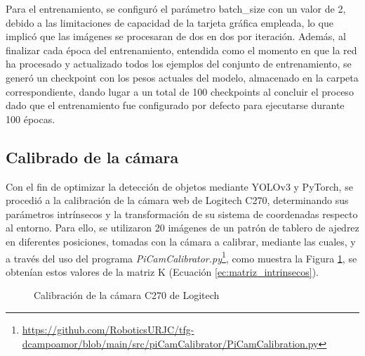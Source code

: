 Para el entrenamiento, se configuró el parámetro batch\_size con un valor de 2, debido a las limitaciones de capacidad de la tarjeta gráfica empleada, lo que implicó que las imágenes se procesaran de dos en dos por iteración. Además, al finalizar cada época del entrenamiento, entendida como el momento en que la red ha procesado y actualizado todos los ejemplos del conjunto de entrenamiento, se generó un checkpoint con los pesos actuales del modelo, almacenado en la carpeta correspondiente, dando lugar a un total de 100 checkpoints al concluir el proceso dado que el entrenamiento fue configurado por defecto para ejecutarse durante 100 épocas.

\subsection{Calibrado de la cámara}
\label{sec:Calibrado_camara}

Con el fin de optimizar la detección de objetos mediante YOLOv3 y PyTorch, se procedió a la calibración de la cámara web de Logitech C270, determinando sus parámetros intrínsecos y la transformación de su sistema de coordenadas respecto al entorno. Para ello, se utilizaron 20 imágenes de un patrón de tablero de ajedrez en diferentes posiciones, tomadas con la cámara a calibrar, mediante las cuales, y a través del uso del programa \textit{PiCamCalibrator.py}\footnote{\url{https://github.com/RoboticsURJC/tfg-dcampoamor/blob/main/src/piCamCalibrator/PiCamCalibration.py}}, como muestra la Figura \ref{fig:calibracion_camara}, se obtenían estos valores de la matriz K (Ecuación \ref{ec:matriz_intrinsecos}). 

 \begin{figure}[H]
    \begin{center}
      \subcapcentertrue
      \hspace{2mm}
    \end{center}
    \caption{Calibración de la cámara C270 de Logitech}
    \label{fig:calibracion_camara}
  \end{figure}

